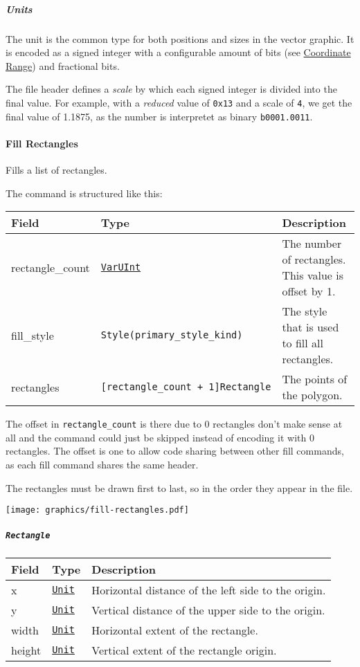 \documentclass[]{article}
\begin{document}
\hypertarget{units}{%
\subparagraph{Units}\label{units}}

The unit is the common type for both positions and sizes in the vector
graphic. It is encoded as a signed integer with a configurable amount of
bits (see \protect\hyperlink{coordinate-range}{Coordinate Range}) and
fractional bits.

The file header defines a \emph{scale} by which each signed integer is
divided into the final value. For example, with a \emph{reduced} value
of \texttt{0x13} and a scale of \texttt{4}, we get the final value of
1.1875, as the number is interpretet as binary \texttt{b0001.0011}.

\hypertarget{fill-rectangles}{%
\paragraph{Fill Rectangles}\label{fill-rectangles}}

Fills a list of rectangles.

The command is structured like this:

\begin{longtable}[]{@{}p{1in}p{2in}p{3in}@{}}
\toprule
Field & Type & Description \\
\midrule
\endhead
rectangle\_count & \protect\hyperlink{varuint}{\texttt{VarUInt}} & The
number of rectangles. This value is offset by 1. \\
fill\_style & \texttt{Style(primary\_style\_kind)} & The style that is
used to fill all rectangles. \\
rectangles & \texttt{{[}rectangle\_count\ +\ 1{]}Rectangle} & The points
of the polygon. \\
\bottomrule
\end{longtable}

The offset in \texttt{rectangle\_count} is there due to 0 rectangles
don't make sense at all and the command could just be skipped instead of
encoding it with 0 rectangles. The offset is one to allow code sharing
between other fill commands, as each fill command shares the same
header.

The rectangles must be drawn first to last, so in the order they appear
in the file.

\texttt{[image: graphics/fill-rectangles.pdf]}

\hypertarget{rectangle}{%
\subparagraph{\texorpdfstring{\texttt{Rectangle}}{Rectangle}}\label{rectangle}}

\begin{longtable}[]{@{}p{1in}p{2in}p{3in}@{}}
\toprule
Field & Type & Description \\
\midrule
\endhead
x & \protect\hyperlink{units}{\texttt{Unit}} & Horizontal distance of
the left side to the origin. \\
y & \protect\hyperlink{units}{\texttt{Unit}} & Vertical distance of the
upper side to the origin. \\
width & \protect\hyperlink{units}{\texttt{Unit}} & Horizontal extent of
the rectangle. \\
height & \protect\hyperlink{units}{\texttt{Unit}} & Vertical extent of
the rectangle origin. \\
\bottomrule
\end{longtable}
\end{document}

